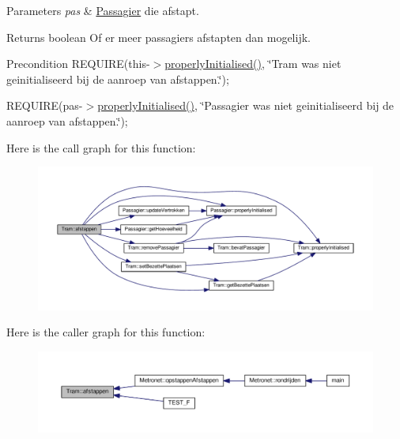 \begin{DoxyParams}{Parameters}
{\em pas} & \hyperlink{class_passagier}{Passagier} die afstapt. \\
\hline
\end{DoxyParams}
\begin{DoxyReturn}{Returns}
boolean Of er meer passagiers afstapten dan mogelijk. 
\end{DoxyReturn}
\begin{DoxyPrecond}{Precondition}
R\+E\+Q\+U\+I\+RE(this-\/$>$\hyperlink{class_tram_a98992eff0453f54fbe64e1f1064169c7}{properly\+Initialised()}, \char`\"{}\+Tram was niet geinitialiseerd bij de aanroep van afstappen.\char`\"{}); 

R\+E\+Q\+U\+I\+RE(pas-\/$>$\hyperlink{class_tram_a98992eff0453f54fbe64e1f1064169c7}{properly\+Initialised()}, \char`\"{}\+Passagier was niet geinitialiseerd bij de aanroep van afstappen.\char`\"{}); 
\end{DoxyPrecond}


Here is the call graph for this function\+:
\nopagebreak
\begin{figure}[H]
\begin{center}
\leavevmode
\includegraphics[width=350pt]{class_tram_aba1c306a2a1aa5bdf40fe6e394baef99_cgraph}
\end{center}
\end{figure}




Here is the caller graph for this function\+:
\nopagebreak
\begin{figure}[H]
\begin{center}
\leavevmode
\includegraphics[width=350pt]{class_tram_aba1c306a2a1aa5bdf40fe6e394baef99_icgraph}
\end{center}
\end{figure}


